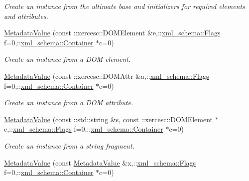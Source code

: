 \begin{DoxyCompactItemize}
\begin{DoxyCompactList}\small\item\em Create an instance from the ultimate base and initializers for required elements and attributes. \item\end{DoxyCompactList}\item 
\hyperlink{classopenstack_1_1xml_1_1MetadataValue_a663ecaef5f738c0a9dc6f20970257962}{MetadataValue} (const ::xercesc::DOMElement \&e,::\hyperlink{namespacexml__schema_affb4c227cbd9aa7453dd1dc5a1401943}{xml\_\-schema::Flags} f=0,::\hyperlink{namespacexml__schema_a333dea2213742aea47a37532dec4ec27}{xml\_\-schema::Container} $\ast$c=0)
\begin{DoxyCompactList}\small\item\em Create an instance from a DOM element. \item\end{DoxyCompactList}\item 
\hyperlink{classopenstack_1_1xml_1_1MetadataValue_a521b5736537b836a445825416e28648c}{MetadataValue} (const ::xercesc::DOMAttr \&a,::\hyperlink{namespacexml__schema_affb4c227cbd9aa7453dd1dc5a1401943}{xml\_\-schema::Flags} f=0,::\hyperlink{namespacexml__schema_a333dea2213742aea47a37532dec4ec27}{xml\_\-schema::Container} $\ast$c=0)
\begin{DoxyCompactList}\small\item\em Create an instance from a DOM attribute. \item\end{DoxyCompactList}\item 
\hyperlink{classopenstack_1_1xml_1_1MetadataValue_aaa1b885b75dff708d3d391e62c88cba4}{MetadataValue} (const ::std::string \&s, const ::xercesc::DOMElement $\ast$e,::\hyperlink{namespacexml__schema_affb4c227cbd9aa7453dd1dc5a1401943}{xml\_\-schema::Flags} f=0,::\hyperlink{namespacexml__schema_a333dea2213742aea47a37532dec4ec27}{xml\_\-schema::Container} $\ast$c=0)
\begin{DoxyCompactList}\small\item\em Create an instance from a string fragment. \item\end{DoxyCompactList}\item 
\hyperlink{classopenstack_1_1xml_1_1MetadataValue_a03f716883ad429ae2e736b4ff07db709}{MetadataValue} (const \hyperlink{classopenstack_1_1xml_1_1MetadataValue}{MetadataValue} \&x,::\hyperlink{namespacexml__schema_affb4c227cbd9aa7453dd1dc5a1401943}{xml\_\-schema::Flags} f=0,::\hyperlink{namespacexml__schema_a333dea2213742aea47a37532dec4ec27}{xml\_\-schema::Container} $\ast$c=0)

\end{DoxyCompactItemize}
